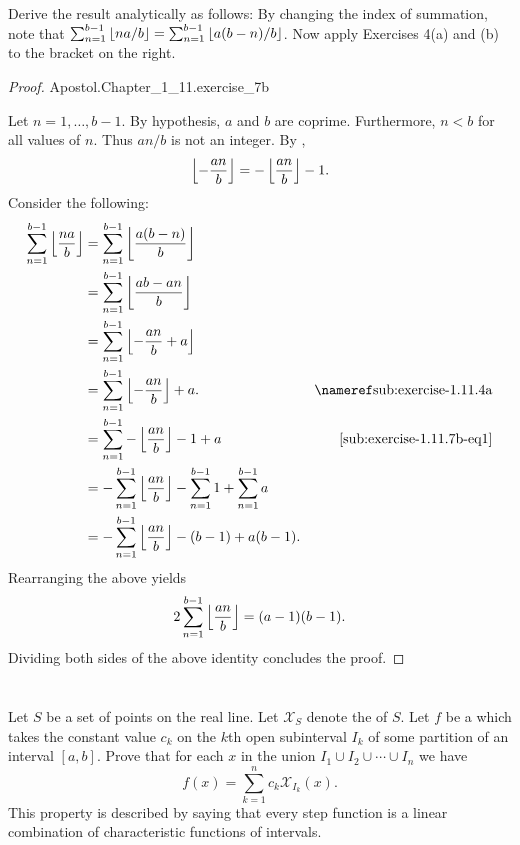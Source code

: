 \documentclass{report}
\begin{document}
Derive the result analytically as follows:
By changing the index of summation, note that
  $\sum_{n=1}^{b-1} \left\lfloor na / b\right\rfloor = \sum_{n=1}^{b-1} \left\lfloor a(b - n) / b\right\rfloor$.
Now apply Exercises 4(a) and (b) to the bracket on the right.

\begin{proof}

    {Apostol.Chapter\_1\_11.exercise\_7b}

  Let $n = 1, \ldots, b - 1$.
  By hypothesis, $a$ and $b$ are coprime.
  Furthermore, $n < b$ for all values of $n$.
  Thus $an / b$ is not an integer.
  By ,
    \begin{equation}
      \label{sub:exercise-1.11.7b-eq1}
      \left\lfloor-\frac{an}{b}\right\rfloor = -\left\lfloor\frac{an}{b}\right\rfloor - 1.
    \end{equation}
  Consider the following:
    \begin{align*}
      \sum_{n=1}^{b-1} \floor{\frac{na}{b}}
        & = \sum_{n=1}^{b-1} \floor{\frac{a(b - n)}{b}} \\
        & = \sum_{n=1}^{b-1} \floor{\frac{ab - an}{b}} \\
        & = \sum_{n=1}^{b-1} \floor{-\frac{an}{b} + a} \\
        & = \sum_{n=1}^{b-1} \floor{-\frac{an}{b}} + a.
          & \textref{sub:exercise-1.11.4a} \\
        & = \sum_{n=1}^{b-1} -\floor{\frac{an}{b}} - 1 + a
          & \eqref{sub:exercise-1.11.7b-eq1} \\
        & = -\sum_{n=1}^{b-1} \floor{\frac{an}{b}} - \sum_{n=1}^{b-1} 1 +
          \sum_{n=1}^{b-1} a \\
        & = -\sum_{n=1}^{b-1} \floor{\frac{an}{b}} - (b - 1) + a(b - 1).
    \end{align*}
  Rearranging the above yields
    $$2\sum_{n=1}^{b-1} \left\lfloor\frac{an}{b}\right\rfloor = (a - 1)(b - 1).$$
  Dividing both sides of the above identity concludes the proof.

\end{proof}

\section{}%
\label{sec:exercise-1.11.8}

Let $S$ be a set of points on the real line.
Let $\mathcal{X}_S$ denote the  of $S$.
Let $f$ be a  which takes the constant value
  $c_k$ on the $k$th open subinterval $I_k$ of some partition of an interval
  $[a, b]$.
Prove that for each $x$ in the union $I_1 \cup I_2 \cup \cdots \cup I_n$ we have
  $$f(x) = \sum_{k=1}^n c_k\mathcal{X}_{I_k}(x).$$
This property is described by saying that every step function is a linear
  combination of characteristic functions of intervals.
\end{document}
